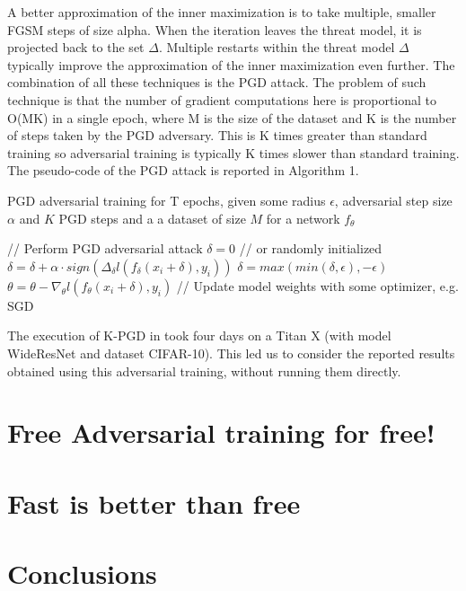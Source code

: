 \documentclass{article}
\begin{document}
A better approximation of the inner maximization is to take multiple, smaller FGSM steps of size alpha. When the iteration leaves the threat model, it is projected back to the set $\Delta$. Multiple restarts within the threat model $\Delta$ typically improve the approximation of the inner maximization even further. The combination of all these techniques is the PGD attack. The problem of such technique is that the number of gradient computations here is proportional to O(MK) in a single epoch, where M is the size of the dataset and K is the number of steps taken by the PGD adversary. This is K times greater than standard training so adversarial training is typically K times slower than standard training. The pseudo-code of the PGD attack is reported in Algorithm 1.
\begin{algorithm}[H]
	\caption{PGD adversarial training for T epochs, given some radius $\epsilon$, adversarial step size $\alpha$ and $K$ PGD steps and a a dataset of size $M$ for a network $f_{\theta}$}
	\begin{algorithmic}[1]
		\State// Perform PGD adversarial attack
		\State $\delta = 0$ // or randomly initialized
		\State $\delta = \delta + \alpha\cdot sign(\Delta_{\delta}l(f_{\delta}(x_i + \delta), y_i))$
		\State $\delta = max(min(\delta, \epsilon), -\epsilon)$
		\EndFor
		\State$\theta = \theta - \nabla_{\theta}l(f_{\theta}(x_i + \delta), y_i)$ // Update model weights with some optimizer, e.g. SGD
		\EndFor
		\EndFor
	\end{algorithmic}
\end{algorithm}
The execution of K-PGD in \cite{MadryEtAl2017} took four days on a Titan X (with model WideResNet and dataset CIFAR-10). This led us to consider the reported results obtained using this adversarial training, without running them directly.


\section{Free Adversarial training for free!}


\section{Fast is better than free}

\section{Conclusions}
\end{document}
